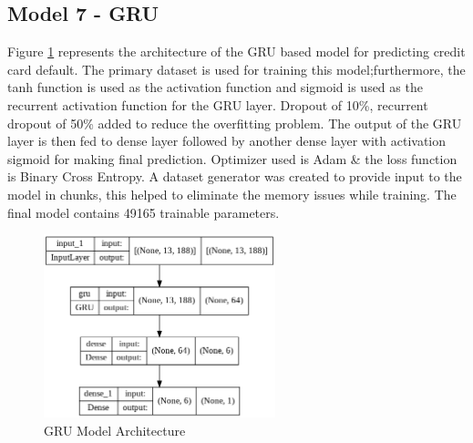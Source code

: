 \documentclass[twoside,11pt,a4paper]{article}
\begin{document}
\subsection{Model 7 - \acf{GRU}}
Figure \ref{fig:gru_arch} represents the architecture of the GRU based model for predicting credit card default. The primary dataset is used for training this model;furthermore, the tanh function is used as the activation function and sigmoid  is used as the recurrent activation function  for the GRU layer. Dropout of 10\%, recurrent dropout of 50\% added to reduce the overfitting problem. The output of the GRU layer is then fed to dense layer followed by another dense layer with activation sigmoid for making final prediction. Optimizer used is Adam \& the loss function is Binary Cross Entropy. A dataset generator was created to provide input to the model in chunks, this helped to eliminate the memory issues while training. The final model contains 49165 trainable parameters.\\

\begin{figure}[ht]
	\centering
	\includegraphics[width=0.6\textwidth, height=0.3\textheight]{gru_arch}
	\caption[GRU Model Architecture]{GRU Model Architecture\\}
	\label{fig:gru_arch}
\end{figure}
\FloatBarrier
\end{document}
